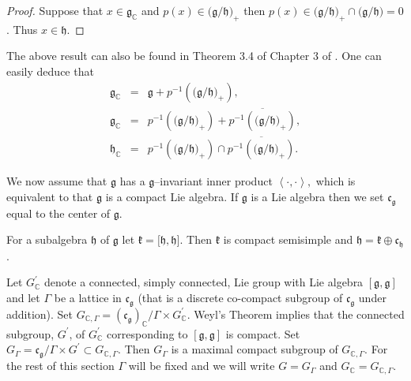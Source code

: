 \documentclass{amse-new}
\numberwithin{equation}{section} %
\begin{document}
\begin{proof}
Suppose that $x\in\mathfrak{g}_{\mathbb{C}}$ and $p(x)\in(\mathfrak{g}/\mathfrak{h)}_{+} $
then $p(x)\in(\mathfrak{g}/\mathfrak{h)}_{+}\cap(\mathfrak{g}/\mathfrak{h)}=0
$. Thus $x\in\mathfrak{h}$.
\end{proof}

 The above result can also be found in Theorem 3.4  of Chapter 3 of \cite{Mura}. One can easily deduce that
 \begin{eqnarray}\label{eq:Kos1}
 \mathfrak{g}_{\mathbb{C}}&=&\mathfrak{g}+p^{-1}\left(  (\mathfrak{g}/\mathfrak{h)}_{+}\right), \\ \mathfrak{g}_{\mathbb{C}}&=& p^{-1}\left((\mathfrak{g}/\mathfrak{h)}_{+}\right)+\overline{p^{-1}\left((\mathfrak{g}/\mathfrak{h)}_{+}\right)},\label{eq:Kos2}\\ \mathfrak{h}_{\mathbb{C}}&=&p^{-1}\left((\mathfrak{g}/\mathfrak{h)}_{+}\right)\cap \overline{p^{-1}\left((\mathfrak{g}/\mathfrak{h)}_{+}\right)}.\label{eq:Kos3}
 \end{eqnarray}

 We now assume that $\mathfrak{g}$ has a $\mathfrak{g}$--invariant inner
product $\left\langle \cdot, \cdot\right\rangle,$ which is equivalent to that
$\mathfrak{g}$ is a compact Lie algebra. If $\mathfrak{g}$ is a Lie algebra
then we set $\mathfrak{c}_{\mathfrak{g}}$ equal to the center of
$\mathfrak{g}$.



For a subalgebra $\mathfrak{h}$ of $\mathfrak{g}$ let
$\mathfrak{k=[\mathfrak{h}},\mathfrak{h}]$. Then $\mathfrak{k}$ is compact
semisimple and $\mathfrak{h}=\mathfrak{k}\oplus\mathfrak{c}_{\mathfrak{h}}$.

Let $G_{\mathbb{C}}^{\prime}$ denote a connected, simply connected, Lie group
with Lie algebra $[\mathfrak{g},\mathfrak{g}]$ and let $\Gamma$ be a lattice
in $\mathfrak{c}_{\mathfrak{g}}$ (that is a discrete co-compact subgroup of
$\mathfrak{c}_{\mathfrak{g}}$ under addition). Set $G_{\mathbb{C},\Gamma
}=\left(  \mathfrak{c}_{\mathfrak{g}}\right)  _{\mathbb{C}}/\Gamma\times
G_{\mathbb{C}}^{\prime}$. Weyl's Theorem implies that the connected subgroup,
$G^{\prime}$, of $G_{\mathbb{C}}^{\prime}$ corresponding to $[\mathfrak{g}%
,\mathfrak{g}]$ is compact. Set $G_{\Gamma}=\mathfrak{c}_{\mathfrak{g}}%
/\Gamma\times G^{\prime}\subset G_{\mathbb{C},\Gamma}$. Then $G_{\Gamma}$ is a
maximal compact subgroup of $G_{\mathbb{C},\Gamma}$. For the rest of this
section $\Gamma$ will be fixed and we will write $G=G_{\Gamma}$ and
$G_{\mathbb{C}}=G_{\mathbb{C},\Gamma}$.
\end{document}
